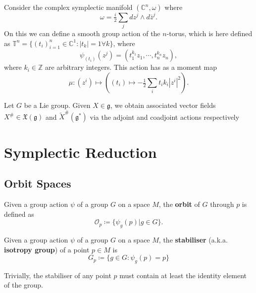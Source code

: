 \documentclass[11pt, final]{article}
\begin{document}
\begin{example}
	Consider the complex symplectic manifold $(\mathbb{C}^n, \omega)$ where
		\begin{equation}
			\omega = \tfrac{i}{2} \sum_j dz^j \wedge d\bar{z}^j.
		\end{equation}
	On this we can define a smooth group action of the $n$-torus, which is here defined as $\mathbb{T}^n = \{ (t_i)_{i=1}^n \in \mathbb{C}^1 : |t_k| = 1 \forall k \}$, where
		\begin{equation}
			\psi_{(t_i)} (z^j) = (t_1^{k_1} z_1, \cdots, t_n^{k_n} z_n),
		\end{equation}
	where $k_i \in \mathbb{Z}$ are arbitrary integers. This action has as a moment map
		\begin{equation}
			\mu: (z^i) \mapsto \left( (t_i) \mapsto -\tfrac{1}{2} \sum_i  t_i k_i |z^i|^2 \right).
		\end{equation}
\end{example}

\begin{remark}
	Let $G$ be a Lie group. Given $X \in \mathfrak{g}$, we obtain associated vector fields $X^\# \in \mathfrak{X}(\mathfrak{g})$ and $\tilde{X}^\#(\mathfrak{g}^*)$ via the adjoint and coadjoint actions respectively
\end{remark}

\section{Symplectic Reduction}

\subsection{Orbit Spaces}

\begin{definition}[Orbit]
	Given a group action $\psi$ of a group $G$ on a space $M$, the \textbf{orbit} of $G$ through $p$ is defined as
		\begin{equation}
			\mathcal{O}_p \coloneqq \{ \psi_g(p) | g \in G \}.
		\end{equation}
\end{definition}

\begin{definition}[Stabiliser]
	Given a group action $\psi$ of a group $G$ on a space $M$, the \textbf{stabiliser} (a.k.a. \textbf{isotropy group}) of a point $p \in M$ is
		\begin{equation}
			G_p \coloneqq \{ g \in G : \psi_g(p) = p \}
		\end{equation}
\end{definition}
\begin{remark}
	Trivially, the stabiliser of any point $p$ must contain at least the identity element of the group.
\end{remark}
\end{document}

